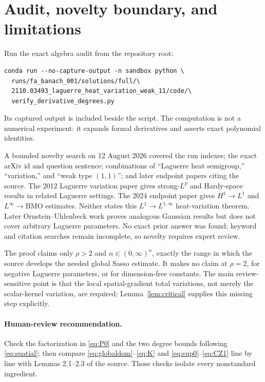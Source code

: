 \documentclass[11pt]{article}
\begin{document}
\section{Audit, novelty boundary, and limitations}

Run the exact algebra audit from the repository root:
\begin{verbatim}
conda run --no-capture-output -n sandbox python \
  runs/fa_banach_001/solutions/full/\
  2110.03493_laguerre_heat_variation_weak_11/code/\
  verify_derivative_degrees.py
\end{verbatim}
Its captured output is included beside the script.  The computation is not a
numerical experiment: it expands formal derivatives and asserts exact
polynomial identities.

A bounded novelty search on 12 August 2026 covered the run indexes; the exact
arXiv id and question sentence; combinations of ``Laguerre heat semigroup,''
``variation,'' and ``weak type $(1,1)$''; and later endpoint papers citing the
source.  The 2012 Laguerre variation paper \cite{bct} gives strong-$L^p$ and
Hardy-space results in related Laguerre settings.  The 2024 endpoint paper
\cite{endpoint} gives $H^1\to L^1$ and $L^\infty\to\mathrm{BMO}$ estimates.
Neither states this $L^1\to L^{1,\infty}$ heat-variation theorem.  Later
Ornstein--Uhlenbeck work proves analogous Gaussian results but does not cover
arbitrary Laguerre parameters.  No exact prior answer was found; keyword and
citation searches remain incomplete, so novelty requires expert review.

The proof claims only $\rho>2$ and $\alpha\in(0,\infty)^n$, exactly the range
in which the source develops the needed global Sasso estimate.  It makes no
claim at $\rho=2$, for negative Laguerre parameters, or for dimension-free
constants.  The main review-sensitive point is that the local spatial-gradient
total variations, not merely the scalar-kernel variation, are required;
Lemma~\ref{lem:critical} supplies this missing step explicitly.

\paragraph{Human-review recommendation.}
Check the factorization in \eqref{eq:P0} and the two degree bounds following
\eqref{eq:spatial}; then compare \eqref{eq:globaldom}--\eqref{eq:K} and
\eqref{eq:sup0}--\eqref{eq:CZ1} line by line with Lemmas 2.1--2.3 of the source.
Those checks isolate every nonstandard ingredient.
\end{document}

